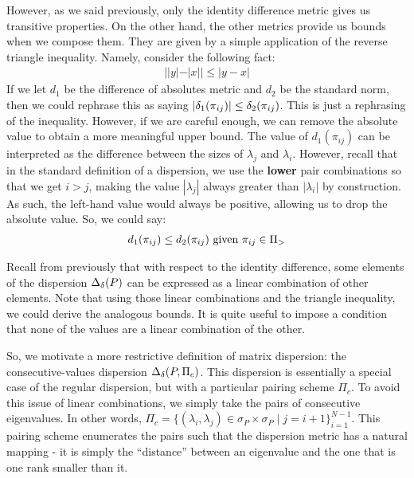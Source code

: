  However, as we said previously, only the identity difference metric gives us transitive properties.
On the other hand, the other metrics provide us bounds when we compose them.
They are given by a simple application of the reverse triangle inequality. Namely, consider the following fact:
\begin{align*}
||y| - |x|| \leq |y - x|
\end{align*}
If we let $d_1$ be the difference of absolutes metric and $d_2$ be the standard norm, then we could rephrase this as saying $|\delta_1(\pi_{ij})| \leq \delta_2(\pi_{ij})$.
This is just a rephrasing of the inequality. However, if we are careful enough, we can remove the absolute value to obtain a more meaningful upper bound.
The value of $d_1(\pi_{ij})$ can be interpreted as the difference between the sizes of $\lambda_j$ and $\lambda_i$.
However, recall that in the standard definition of a dispersion, we use the \textbf{lower} pair combinations so that we get $i > j$, making the value $|\lambda_j|$ always greater than $|\lambda_i|$ by construction.
As such, the left-hand value would always be positive, allowing us to drop the absolute value. So, we could say:
\begin{align*}
d_1(\pi_{ij}) \leq d_2(\pi_{ij}) \text{ given } \pi_{ij} \in \Pi_>
\end{align*}
\medskip

 Recall from previously that with respect to the identity difference, some elements of the dispersion $\Delta_\delta(P)$ can be expressed as a linear combination of other elements.
Note that using those linear combinations and the triangle inequality, we could derive the analogous bounds.
 It is quite useful to impose a condition that none of the values are a linear combination of the other.

So, we motivate a more restrictive definition of matrix dispersion: the consecutive-values dispersion $\Delta_\delta(P, \Pi_c)$.
This dispersion is essentially a special case of the regular dispersion, but with a particular pairing scheme $\Pi_c$.
To avoid this issue of linear combinations, we simply take the pairs of consecutive eigenvalues.
In other words, $\Pi_c = \{(\lambda_i, \lambda_j) \in \sigma_P \times \sigma_P  \mid j = i+1\}_{i=1}^{N-1}$.
This pairing scheme enumerates the pairs such that the dispersion metric has a natural mapping - it is simply the ``distance'' between an eigenvalue and the one that is one rank smaller than it.

